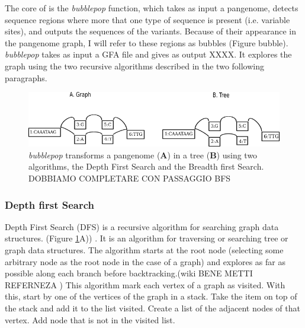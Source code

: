 The core of \vgp is the \textit{bubblepop} function, which takes as input a pangenome, detects sequence regions where more that one type of sequence is present (i.e. variable sites), and outputs the sequences of the variants. Because of their appearance in the pangenome graph, I will refer to these regions as bubbles (Figure bubble). \\

\textit{bubblepop} takes as input a GFA file and gives as output XXXX. It explores the graph using the two recursive algorithms described in the two following paragraphs.

\begin{figure}[H]
\centering
\includegraphics[width=1.10\textwidth]{fig/graph_tree.png}
\decoRule
\caption{\textit{bubblepop} transforms a pangenome (\textbf{A}) in a tree (\textbf{B}) using two algorithms, the Depth First Search and the Breadth first Search. DOBBIAMO COMPLETARE CON PASSAGGIO BFS }
\label{fig:graph_tree.png}
\end{figure}




\setcounter{secnumdepth}{3}
\subsubsection{Depth first Search}

Depth First Search (DFS) is a recursive algorithm for searching graph data structures. (Figure \ref{fig:graph_tree.png}A)) \cite{korf1985depth}. 
It is an algorithm for traversing or searching tree or graph data structures. The algorithm starts at the root node (selecting some arbitrary node as the root node in the case of a graph) and explores as far as possible along each branch before backtracking.(wiki BENE METTI REFERNEZA )
This algorithm mark each vertex of a graph as visited. With this, start by one of the vertices of the graph in a stack. Take the item on top of the stack and add it to the list visited. Create a list of the adjacent nodes of that vertex. Add node that is not in the visited list.

